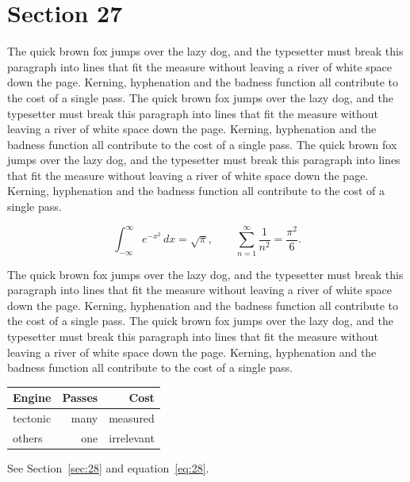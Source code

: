 \documentclass{article}
\begin{document}
\section{Section 27}
\label{sec:27}
The quick brown fox jumps over the lazy dog, and the typesetter must break this paragraph into lines that fit the measure without leaving a river of white space down the page. Kerning, hyphenation and the badness function all contribute to the cost of a single pass. The quick brown fox jumps over the lazy dog, and the typesetter must break this paragraph into lines that fit the measure without leaving a river of white space down the page. Kerning, hyphenation and the badness function all contribute to the cost of a single pass. The quick brown fox jumps over the lazy dog, and the typesetter must break this paragraph into lines that fit the measure without leaving a river of white space down the page. Kerning, hyphenation and the badness function all contribute to the cost of a single pass. 

\begin{equation}\label{eq:27}
\int_{-\infty}^{\infty} e^{-x^{2}}\,dx = \sqrt{\pi}, \qquad
\sum_{n=1}^{\infty} \frac{1}{n^{2}} = \frac{\pi^{2}}{6}.
\end{equation}

The quick brown fox jumps over the lazy dog, and the typesetter must break this paragraph into lines that fit the measure without leaving a river of white space down the page. Kerning, hyphenation and the badness function all contribute to the cost of a single pass. The quick brown fox jumps over the lazy dog, and the typesetter must break this paragraph into lines that fit the measure without leaving a river of white space down the page. Kerning, hyphenation and the badness function all contribute to the cost of a single pass. 

\begin{center}
\begin{tabular}{lrr}
\toprule
Engine & Passes & Cost \\
\midrule
tectonic & many & measured \\
others & one & irrelevant \\
\bottomrule
\end{tabular}
\end{center}

See Section~\ref{sec:28} and equation~\eqref{eq:28}.
\end{document}

